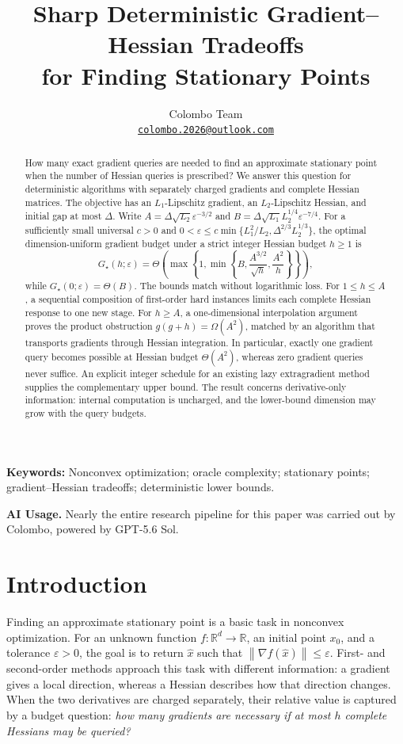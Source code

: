 \documentclass[11pt]{article}
\title{\textbf{Sharp Deterministic Gradient--Hessian Tradeoffs\\
for Finding Stationary Points}}
\author{Colombo Team\\[0.4em]
\small\href{mailto:colombo.2026@outlook.com}{\texttt{colombo.2026@outlook.com}}}
\date{}
\theoremstyle{remark}
\theoremstyle{remark}
\newcommand{\R}{\mathbb R}
\newcommand{\eps}{\varepsilon}
\newcommand{\norm}[1]{\left\lVert#1\right\rVert}
\begin{document}
\maketitle
\begin{abstract}
How many exact gradient queries are needed to find an approximate stationary
point when the number of Hessian queries is prescribed? We answer this
question for deterministic algorithms with separately charged gradients and
complete Hessian matrices. The objective has an $L_1$-Lipschitz gradient, an
$L_2$-Lipschitz Hessian, and initial gap at most $\Delta$. Write
$A=\Delta\sqrt{L_2}\eps^{-3/2}$ and
$B=\Delta\sqrt{L_1}L_2^{1/4}\eps^{-7/4}$. For a sufficiently small universal $c>0$ and
$0<\eps\le c\min\{L_1^2/L_2,\Delta^{2/3}L_2^{1/3}\}$, the optimal
dimension-uniform gradient budget under a strict integer Hessian budget $h\ge1$ is
\[
 G_\star(h;\eps)=\Theta\!\left(
 \max\left\{1,\min\left\{B,\frac{A^{3/2}}{\sqrt h},\frac{A^2}{h}\right\}\right\}
 \right),
\]
while $G_\star(0;\eps)=\Theta(B)$. The bounds match without logarithmic
loss. For $1\le h\le A$, a sequential composition of first-order hard instances
limits each complete Hessian response to one new stage. For $h\ge A$, a
one-dimensional interpolation argument proves the product obstruction
$g(g+h)=\Omega(A^2)$, matched by an algorithm that transports gradients
through Hessian integration. In particular, exactly one gradient query
becomes possible at Hessian budget $\Theta(A^2)$, whereas zero gradient
queries never suffice. An explicit integer schedule for an existing lazy
extragradient method supplies the complementary upper bound. The result
concerns derivative-only information: internal computation is uncharged,
and the lower-bound dimension may grow with the query budgets.
\end{abstract}

\noindent\textbf{Keywords:}
Nonconvex optimization; oracle complexity; stationary points;
gradient--Hessian tradeoffs; deterministic lower bounds.
\par\medskip
\begin{samepage}
\noindent\textbf{AI Usage.}
Nearly the entire research pipeline for this paper was carried out by
Colombo, powered by GPT-5.6 Sol. 
\par
\end{samepage}

\section{Introduction}\label{sec:intro}
Finding an approximate stationary point is a basic task in nonconvex
optimization. For an unknown function $f:\R^d\to\R$, an initial point
$x_0$, and a tolerance $\eps>0$, the goal is to return $\hat x$ such that
$\norm{\nabla f(\hat x)}\le\eps$. First- and second-order methods approach
this task with different information: a gradient gives a local direction,
whereas a Hessian describes how that direction changes. When the two
derivatives are charged separately, their relative value is captured by
a budget question:
\emph{how many gradients are necessary if at most $h$ complete Hessians
may be queried?}
\end{document}
